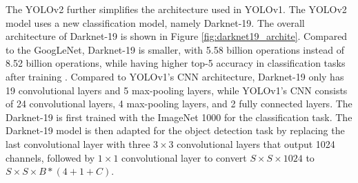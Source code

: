 The YOLOv2 further simplifies the architecture used in YOLOv1. The YOLOv2 model uses a new classification model, namely Darknet-19. The overall architecture of Darknet-19 is shown in Figure \ref{fig:darknet19_archite}. Compared to the GoogLeNet, Darknet-19 is smaller, with 5.58 billion operations instead of 8.52 billion operations, while having higher top-5 accuracy in classification tasks after training \cite{yolo9000_2017}. Compared to YOLOv1's CNN architecture, Darknet-19 only has 19 convolutional layers and 5 max-pooling layers, while YOLOv1's CNN consists of 24 convolutional layers, 4 max-pooling layers, and 2 fully connected layers. The Darknet-19 is first trained with the ImageNet 1000 for the classification task. The Darknet-19 model is then adapted for the object detection task by replacing the last convolutional layer with three $3 \times 3$ convolutional layers that output 1024 channels, followed by $1 \times 1$ convolutional layer to convert $S \times S \times 1024$ to $S \times S \times B*(4+1+C)$.